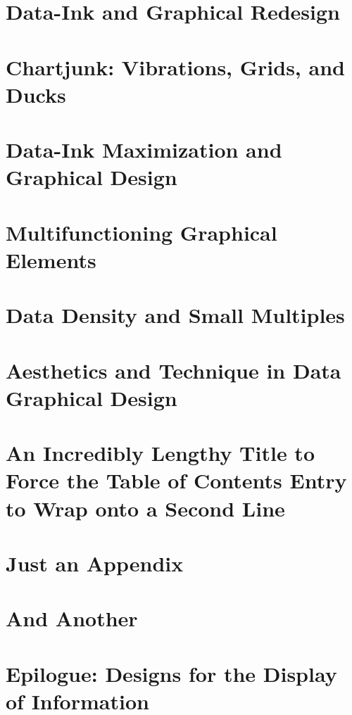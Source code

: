 \documentclass{bayeshyp}
\begin{document}
\chapter{Data-Ink and Graphical Redesign}
\setcounter{page}{91}

\chapter{Chartjunk: Vibrations, Grids, and Ducks}
\setcounter{page}{107}

\chapter{Data-Ink Maximization and Graphical Design}
\setcounter{page}{123}

\chapter{Multifunctioning Graphical Elements}
\setcounter{page}{139}

\chapter{Data Density and Small Multiples}
\setcounter{page}{161}

\chapter{Aesthetics and Technique in Data Graphical Design}
\setcounter{page}{177}

\chapter{An Incredibly Lengthy Title to Force the Table of Contents Entry to Wrap onto a Second Line}
\setcounter{page}{181}

\appendix

\chapter{Just an Appendix}
\setcounter{page}{183}

\chapter{And Another}
\setcounter{page}{185}

\backmatter
\chapter{Epilogue: Designs for the Display of Information}
\setcounter{page}{191}



\end{document}
